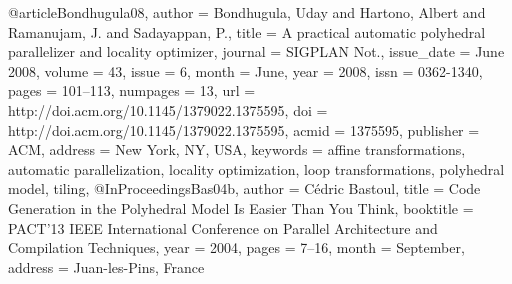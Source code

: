 @article{Bondhugula08,
 author = {Bondhugula, Uday and Hartono, Albert and Ramanujam, J. and Sadayappan, P.},
 title = {A practical automatic polyhedral parallelizer and locality optimizer},
 journal = {SIGPLAN Not.},
 issue_date = {June 2008},
 volume = {43},
 issue = {6},
 month = {June},
 year = {2008},
 issn = {0362-1340},
 pages = {101--113},
 numpages = {13},
 url = {http://doi.acm.org/10.1145/1379022.1375595},
 doi = {http://doi.acm.org/10.1145/1379022.1375595},
 acmid = {1375595},
 publisher = {ACM},
 address = {New York, NY, USA},
 keywords = {affine transformations, automatic parallelization, locality optimization, loop transformations, polyhedral model, tiling},
}
@InProceedings{Bas04b,
 author = {C\'{e}dric Bastoul},
 title = {Code Generation in the Polyhedral Model Is Easier Than You Think},
 booktitle = {PACT'13 IEEE International Conference on Parallel Architecture
              and Compilation Techniques},
 year =	2004,
 pages = {7--16},
 month = {September},
 address = {Juan-les-Pins, France}
}
